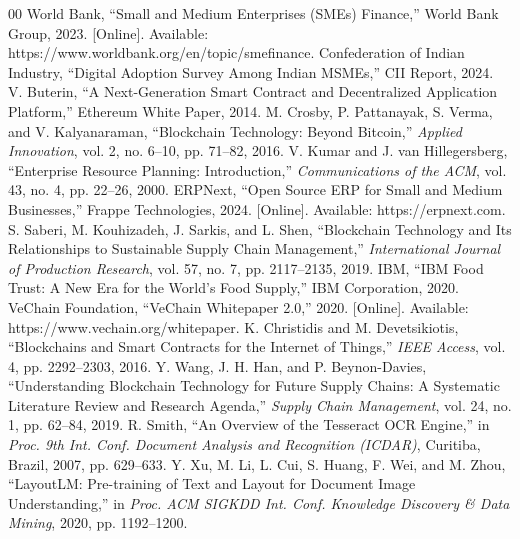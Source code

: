 \documentclass[conference]{IEEEtran}
\begin{document}
\begin{thebibliography}{00}
 World Bank, ``Small and Medium Enterprises (SMEs) Finance,'' World Bank Group, 2023. [Online]. Available: https://www.worldbank.org/en/topic/smefinance.
 Confederation of Indian Industry, ``Digital Adoption Survey Among Indian MSMEs,'' CII Report, 2024.
 V. Buterin, ``A Next-Generation Smart Contract and Decentralized Application Platform,'' Ethereum White Paper, 2014.
 M. Crosby, P. Pattanayak, S. Verma, and V. Kalyanaraman, ``Blockchain Technology: Beyond Bitcoin,'' \textit{Applied Innovation}, vol. 2, no. 6--10, pp. 71--82, 2016.
 V. Kumar and J. van Hillegersberg, ``Enterprise Resource Planning: Introduction,'' \textit{Communications of the ACM}, vol. 43, no. 4, pp. 22--26, 2000.
 ERPNext, ``Open Source ERP for Small and Medium Businesses,'' Frappe Technologies, 2024. [Online]. Available: https://erpnext.com.
 S. Saberi, M. Kouhizadeh, J. Sarkis, and L. Shen, ``Blockchain Technology and Its Relationships to Sustainable Supply Chain Management,'' \textit{International Journal of Production Research}, vol. 57, no. 7, pp. 2117--2135, 2019.
 IBM, ``IBM Food Trust: A New Era for the World's Food Supply,'' IBM Corporation, 2020.
 VeChain Foundation, ``VeChain Whitepaper 2.0,'' 2020. [Online]. Available: https://www.vechain.org/whitepaper.
 K. Christidis and M. Devetsikiotis, ``Blockchains and Smart Contracts for the Internet of Things,'' \textit{IEEE Access}, vol. 4, pp. 2292--2303, 2016.
 Y. Wang, J. H. Han, and P. Beynon-Davies, ``Understanding Blockchain Technology for Future Supply Chains: A Systematic Literature Review and Research Agenda,'' \textit{Supply Chain Management}, vol. 24, no. 1, pp. 62--84, 2019.
 R. Smith, ``An Overview of the Tesseract OCR Engine,'' in \textit{Proc. 9th Int. Conf. Document Analysis and Recognition (ICDAR)}, Curitiba, Brazil, 2007, pp. 629--633.
 Y. Xu, M. Li, L. Cui, S. Huang, F. Wei, and M. Zhou, ``LayoutLM: Pre-training of Text and Layout for Document Image Understanding,'' in \textit{Proc. ACM SIGKDD Int. Conf. Knowledge Discovery \& Data Mining}, 2020, pp. 1192--1200.
\end{thebibliography}
\end{document}
